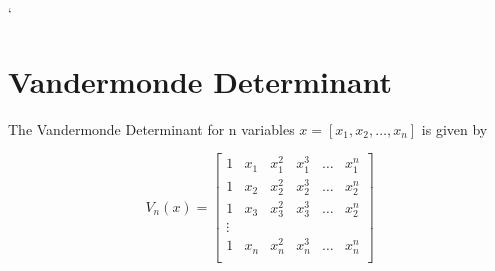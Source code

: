 `%

\section{Vandermonde Determinant}

The Vandermonde Determinant for n variables $x = [x_1, x_2, \hdots, x_n]$ is given by 

$$V_n(x) =  
\begin{bmatrix}
1 & x_1 & x_1^2 &  x_1^3 & \hdots & x_1^n \\
1 & x_2 & x_2^2 &  x_2^3 &\hdots &x_2^n \\
1 &  x_3 & x_3^2 & x_3^3 &\hdots & x_2^n \\
\vdots \\
1 & x_n & x_n^2 & x_n^3 &\hdots & x_n^n \\
\end{bmatrix}
$$

